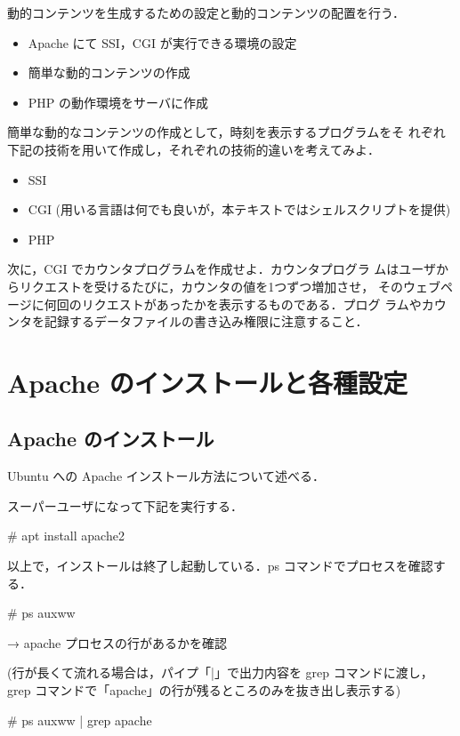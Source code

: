 動的コンテンツを生成するための設定と動的コンテンツの配置を行う．
\begin{itemize}
\item Apache にて SSI，CGI が実行できる環境の設定
\item 簡単な動的コンテンツの作成
\item PHP の動作環境をサーバに作成
\end{itemize}

簡単な動的なコンテンツの作成として，時刻を表示するプログラムをそ
れぞれ下記の技術を用いて作成し，それぞれの技術的違いを考えてみよ．
\begin{itemize}
 \item SSI
 \item CGI (用いる言語は何でも良いが，本テキストではシェルスクリプトを提供)
 \item PHP
\end{itemize}

次に，CGI でカウンタプログラムを作成せよ．カウンタプログラ
ムはユーザからリクエストを受けるたびに，カウンタの値を1つずつ増加させ，
そのウェブページに何回のリクエストがあったかを表示するものである．プログ
ラムやカウンタを記録するデータファイルの書き込み権限に注意すること．

\section{Apache のインストールと各種設定}

\subsection{Apache のインストール}

Ubuntu への Apache インストール方法について述べる．

スーパーユーザになって下記を実行する．
\begin{cli}
# apt install apache2
\end{cli}

以上で，インストールは終了し起動している．ps コマンドでプロセスを確認する．
\begin{cli}
# ps auxww

 → apache プロセスの行があるかを確認

(行が長くて流れる場合は，パイプ「|」で出力内容を grep コマンドに渡し，
grep コマンドで「apache」の行が残るところのみを抜き出し表示する)

# ps auxww | grep apache

\end{cli}

